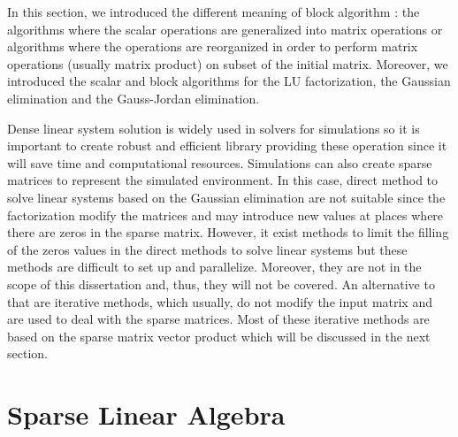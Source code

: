 In this section, we introduced the different meaning of block algorithm : the algorithms where the scalar operations are generalized into matrix operations or algorithms where the operations are reorganized in order to perform matrix operations (usually matrix product) on subset of the initial matrix.
Moreover, we introduced the scalar and block algorithms for the LU factorization, the Gaussian elimination and the Gauss-Jordan elimination.

Dense linear system solution is widely used in solvers for simulations so it is important to create robust and efficient library providing these operation since it will save time and computational resources.
Simulations can also create sparse matrices to represent the simulated environment.
In this case, direct method to solve linear systems based on the Gaussian elimination are not suitable since the factorization modify the matrices and may introduce new values at places where there are zeros in the sparse matrix.
However, it exist methods to limit the filling of the zeros values in the direct methods to solve linear systems but these methods are difficult to set up and parallelize.
Moreover, they are not in the scope of this dissertation and, thus, they will not be covered.
An alternative to that are iterative methods, which usually, do not modify the input matrix and are used to deal with the sparse matrices.
Most of these iterative methods are based on the sparse matrix vector product which will be discussed in the next section.


\section{Sparse Linear Algebra}

